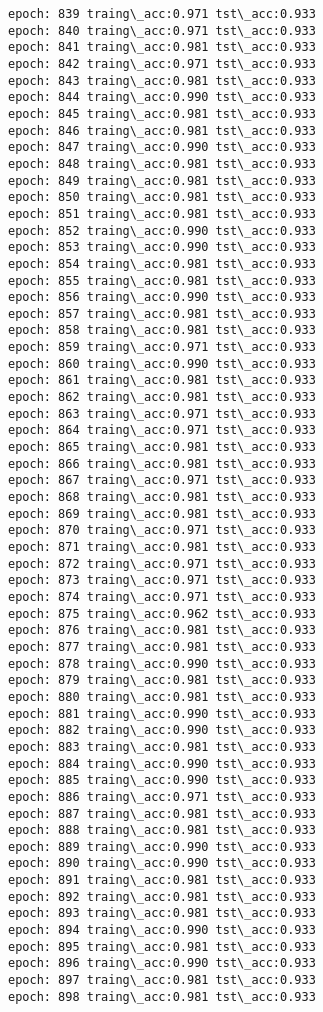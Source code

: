 \documentclass[11pt]{article}
\begin{document}
\begin{Verbatim}[commandchars=\\\{\}]
epoch: 839 traing\_acc:0.971 tst\_acc:0.933
epoch: 840 traing\_acc:0.971 tst\_acc:0.933
epoch: 841 traing\_acc:0.981 tst\_acc:0.933
epoch: 842 traing\_acc:0.971 tst\_acc:0.933
epoch: 843 traing\_acc:0.981 tst\_acc:0.933
epoch: 844 traing\_acc:0.990 tst\_acc:0.933
epoch: 845 traing\_acc:0.981 tst\_acc:0.933
epoch: 846 traing\_acc:0.981 tst\_acc:0.933
epoch: 847 traing\_acc:0.990 tst\_acc:0.933
epoch: 848 traing\_acc:0.981 tst\_acc:0.933
epoch: 849 traing\_acc:0.981 tst\_acc:0.933
epoch: 850 traing\_acc:0.981 tst\_acc:0.933
epoch: 851 traing\_acc:0.981 tst\_acc:0.933
epoch: 852 traing\_acc:0.990 tst\_acc:0.933
epoch: 853 traing\_acc:0.990 tst\_acc:0.933
epoch: 854 traing\_acc:0.981 tst\_acc:0.933
epoch: 855 traing\_acc:0.981 tst\_acc:0.933
epoch: 856 traing\_acc:0.990 tst\_acc:0.933
epoch: 857 traing\_acc:0.981 tst\_acc:0.933
epoch: 858 traing\_acc:0.981 tst\_acc:0.933
epoch: 859 traing\_acc:0.971 tst\_acc:0.933
epoch: 860 traing\_acc:0.990 tst\_acc:0.933
epoch: 861 traing\_acc:0.981 tst\_acc:0.933
epoch: 862 traing\_acc:0.981 tst\_acc:0.933
epoch: 863 traing\_acc:0.971 tst\_acc:0.933
epoch: 864 traing\_acc:0.971 tst\_acc:0.933
epoch: 865 traing\_acc:0.981 tst\_acc:0.933
epoch: 866 traing\_acc:0.981 tst\_acc:0.933
epoch: 867 traing\_acc:0.971 tst\_acc:0.933
epoch: 868 traing\_acc:0.981 tst\_acc:0.933
epoch: 869 traing\_acc:0.981 tst\_acc:0.933
epoch: 870 traing\_acc:0.971 tst\_acc:0.933
epoch: 871 traing\_acc:0.981 tst\_acc:0.933
epoch: 872 traing\_acc:0.971 tst\_acc:0.933
epoch: 873 traing\_acc:0.971 tst\_acc:0.933
epoch: 874 traing\_acc:0.971 tst\_acc:0.933
epoch: 875 traing\_acc:0.962 tst\_acc:0.933
epoch: 876 traing\_acc:0.981 tst\_acc:0.933
epoch: 877 traing\_acc:0.981 tst\_acc:0.933
epoch: 878 traing\_acc:0.990 tst\_acc:0.933
epoch: 879 traing\_acc:0.981 tst\_acc:0.933
epoch: 880 traing\_acc:0.981 tst\_acc:0.933
epoch: 881 traing\_acc:0.990 tst\_acc:0.933
epoch: 882 traing\_acc:0.990 tst\_acc:0.933
epoch: 883 traing\_acc:0.981 tst\_acc:0.933
epoch: 884 traing\_acc:0.990 tst\_acc:0.933
epoch: 885 traing\_acc:0.990 tst\_acc:0.933
epoch: 886 traing\_acc:0.971 tst\_acc:0.933
epoch: 887 traing\_acc:0.981 tst\_acc:0.933
epoch: 888 traing\_acc:0.981 tst\_acc:0.933
epoch: 889 traing\_acc:0.990 tst\_acc:0.933
epoch: 890 traing\_acc:0.990 tst\_acc:0.933
epoch: 891 traing\_acc:0.981 tst\_acc:0.933
epoch: 892 traing\_acc:0.981 tst\_acc:0.933
epoch: 893 traing\_acc:0.981 tst\_acc:0.933
epoch: 894 traing\_acc:0.990 tst\_acc:0.933
epoch: 895 traing\_acc:0.981 tst\_acc:0.933
epoch: 896 traing\_acc:0.990 tst\_acc:0.933
epoch: 897 traing\_acc:0.981 tst\_acc:0.933
epoch: 898 traing\_acc:0.981 tst\_acc:0.933

\end{Verbatim}
\end{document}

